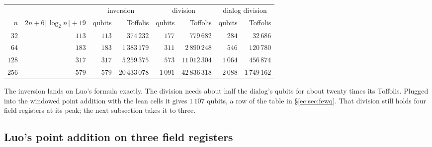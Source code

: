 \documentclass[11pt]{article}
\theoremstyle{plain}
\theoremstyle{remark}
\begin{document}
\begin{center}\small
\begin{tabular}{rrrrrrrr}
\toprule
& & \multicolumn{2}{c}{inversion} & \multicolumn{2}{c}{division} & \multicolumn{2}{c}{dialog division}\\
$n$ & $2n+6\lfloor\log_2n\rfloor+19$ & qubits & Toffolis & qubits & Toffolis & qubits & Toffolis\\
\midrule
$32$ & $113$ & $113$ & $374\,232$ & $177$ & $779\,682$ & $284$ & $32\,686$\\
$64$ & $183$ & $183$ & $1\,383\,179$ & $311$ & $2\,890\,248$ & $546$ & $120\,780$\\
$128$ & $317$ & $317$ & $5\,259\,375$ & $573$ & $11\,012\,304$ & $1\,064$ & $456\,874$\\
$256$ & $579$ & $579$ & $20\,433\,078$ & $1\,091$ & $42\,836\,318$ & $2\,088$ & $1\,749\,162$\\
\bottomrule
\end{tabular}
\end{center}

\noindent The inversion lands on Luo's formula exactly. The division needs about half the dialog's
qubits for about twenty times its Toffolis. Plugged into the windowed point addition with the lean
cells it gives $1\,107$ qubits, a row of the table in \S\ref{ec:sec:fewq}. That division
still holds four field registers at its peak; the next subsection takes it to three.

\subsection{Luo's point addition on three field registers}\label{ec:sec:luo3}
\end{document}
